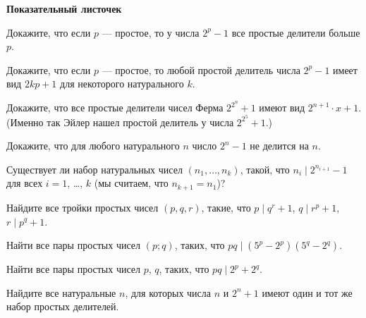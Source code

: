 \centerline{\bf \Huge Показательный листочек}
\centerline{\bf \Huge }

\begin{flushright}
        \scriptsize{}
\end{flushright}


Докажите, что если $p$ --- простое, то у числа $2^p-1$ все простые делители больше $p$.

Докажите, что если $p$ --- простое, то любой простой делитель числа $2^p-1$ имеет вид $2kp+1$ для некоторого натурального $k$.

Докажите, что все простые делители чисел Ферма $2^{2^n}+1$ имеют вид $2^{n+1}\cdot x+1$. (Именно так Эйлер нашел простой делитель у числа $2^{2^5}+1$.)

Докажите, что для любого натурального $n$ число $2^n-1$ не делится на $n$.

Существует ли набор натуральных чисел $(n_1,\ldots,n_k)$, такой, что $n_i\mid 2^{n_{i+1}}-1$ для всех $i=1$, \ldots, $k$ (мы считаем, что $n_{k+1}=n_1$)?

Найдите все тройки простых чисел $(p,q,r)$, такие, что $p \mid q^r+1$, $q \mid r^p+1$, $r \mid p^q+1$.

Найти все пары простых чисел $(p;q)$, таких, что $pq \mid (5^p-2^p)(5^q-2^q)$.

Найти все пары простых чисел $p$, $q$, таких, что $pq \mid 2^p+2^q$.

Найдите все натуральные $n$, для которых числа $n$ и $2^n + 1$ имеют один и тот же набор простых делителей.


